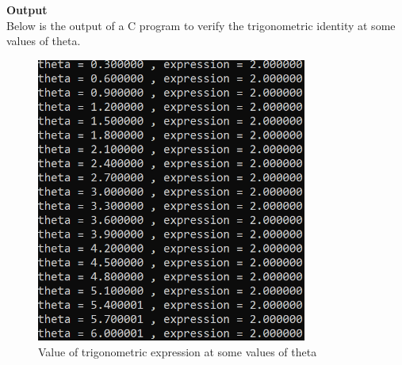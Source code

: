 \documentclass[journal,12pt,twocolumn]{IEEEtran}
\begin{document}
\textbf{\Large{Output}}\\[.1in]
Below is the output of a C program to verify the trigonometric identity at some values of theta.
\begin{figure}[H]
\includegraphics[width=3.5in]{fig.png}
\caption{Value of trigonometric expression at some values of theta}
\end{figure}
\end{document}
